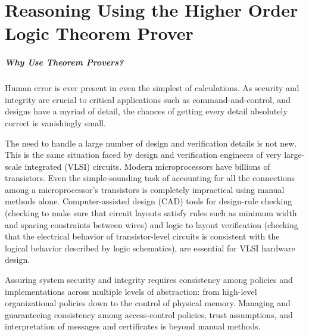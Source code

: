 
\chapter{Reasoning Using the Higher Order Logic Theorem Prover\\
\small{}}
\label{chap:hol}


\paragraph*{Why Use Theorem Provers?}

Human error is ever present in even the simplest of calculations. As
security and integrity are crucial to critical applications such as
command-and-control, and designs have a myriad of detail, the chances
of getting every detail absolutely correct is vanishingly
small. 

The need to handle a large number of design and verification details
is not new. This is the same situation faced by design and
verification engineers of very large-scale integrated (VLSI)
circuits. Modern microprocessors have billions of transistors. Even
the simple-sounding task of accounting for all the connections among a
microprocessor's transistors is completely impractical using manual
methods alone. Computer-assisted design (CAD) tools for design-rule
checking (checking to make sure that circuit layouts satisfy rules
such as minimum width and spacing constraints between wires) and logic
to layout verification (checking that the electrical behavior of
transistor-level circuits is consistent with the logical behavior
described by logic schematics), are essential for VLSI hardware
design.

Assuring system security and integrity requires consistency among
policies and implementations across multiple levels of abstraction:
from high-level organizational policies down to the control of
physical memory. Managing and guaranteeing consistency among
access-control policies, trust assumptions, and interpretation of
messages and certificates is beyond manual methods.

